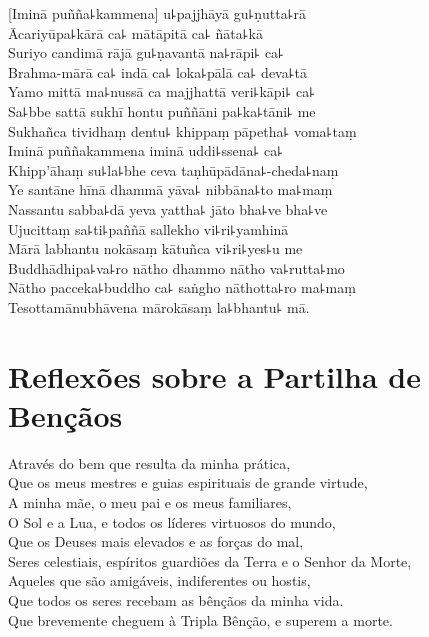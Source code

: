 \documentclass[
  babelLanguage=portuguese,
  final,
  showtrims,
]{chantingbook}
\begin{document}
[Iminā puñña꜕kammena] u꜕pajjhāyā gu꜕ṇutta꜕rā\\
Ācariyūpa꜕kārā ca꜕ mātāpitā ca꜕ ñāta꜕kā\\
Suriyo candimā rājā gu꜕ṇavantā na꜕rāpi꜕ ca꜕\\
Brahma-mārā ca꜕ indā ca꜕ loka꜕pālā ca꜕ deva꜕tā\\
Yamo mittā ma꜕nussā ca majjhattā veri꜕kāpi꜕ ca꜕\\
Sa꜕bbe sattā sukhī hontu puññāni pa꜕ka꜕tāni꜕ me\\
Sukhañca tividhaṃ dentu꜕ khippaṃ pāpetha꜕ voma꜕taṃ\\
Iminā puññakammena iminā uddi꜕ssena꜕ ca꜕\\
Khipp'āhaṃ su꜕la꜕bhe ceva taṇhūpādāna꜕-cheda꜕naṃ\\
Ye santāne hīnā dhammā yāva꜕ nibbāna꜕to ma꜕maṃ\\
Nassantu sabba꜕dā yeva yattha꜕ jāto bha꜕ve bha꜕ve\\
Ujucittaṃ sa꜕ti꜕paññā sallekho vi꜕ri꜕yamhinā\\
Mārā labhantu nokāsaṃ kātuñca vi꜕ri꜕yes꜕u me\\
Buddhādhipa꜕va꜕ro nātho dhammo nātho va꜕rutta꜕mo\\
Nātho pacceka꜕buddho ca꜕ saṅgho nāthotta꜕ro ma꜕maṃ\\
Tesottamānubhāvena mārokāsaṃ la꜕bhantu꜕ mā.

\chapter{Reflexões sobre a Partilha de Bençãos}

\enlargethispage{\baselineskip}

\begin{leader}
\end{leader}

Através do bem que resulta da minha prática,\\
Que os meus mestres e guias espirituais de grande virtude,\\
A minha mãe, o meu pai e os meus familiares,\\
O Sol e a Lua, e todos os líderes virtuosos do mundo,\\
Que os Deuses mais elevados e as forças do mal,\\
Seres celestiais, espíritos guardiões da Terra e o Senhor da Morte,\\
Aqueles que são amigáveis, indiferentes ou hostis,\\
Que todos os seres recebam as bênçãos da minha vida.\\
Que brevemente cheguem à Tripla Bênção, e superem a morte.
\end{document}
